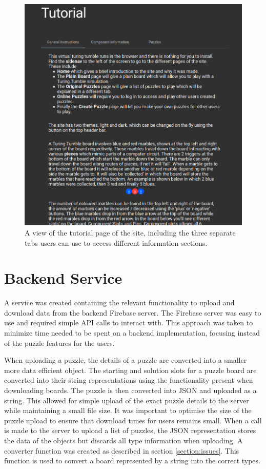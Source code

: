 \documentclass{l4proj}
\begin{document}
\begin{figure}
    \centering
    \includegraphics[width=0.65\linewidth]{images/tutorial.png}
    \caption{A view of the tutorial page of the site, including the three separate tabs users can use to access different information sections.}
    \label{fig:tutorial}
\end{figure}


\section{Backend Service}
A service was created containing the relevant functionality to upload and download data from the backend Firebase server. The Firebase server was easy to use and required simple API calls to interact with. This approach was taken to minimize time needed to be spent on a backend implementation, focusing instead of the puzzle features for the users. 


When uploading a puzzle, the details of a puzzle are converted into a smaller more data efficient object. The starting and solution slots for a puzzle board are converted into their string representations using the functionality present when downloading boards. The puzzle is then converted into JSON and uploaded as a string. This allowed for simple upload of the exact puzzle details to the server while maintaining a small file size. It was important to optimise the size of the puzzle upload to ensure that download times for users remains small. When a call is made to the server to upload a list of puzzles, the JSON representation stores the data of the objects but discards all type information when uploading. A converter function was created as described in section \ref{section:issues}. This function is used to convert a board represented by a string into the correct types.
\end{document}
